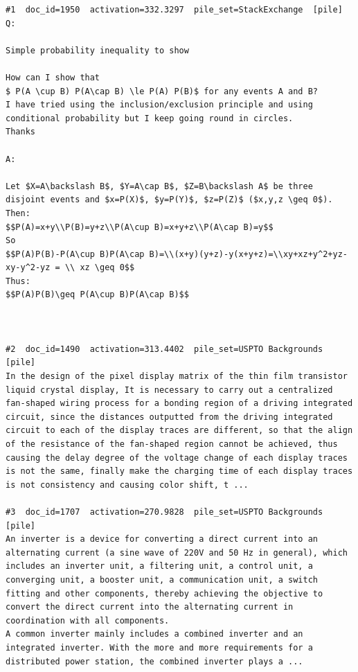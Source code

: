 \begin{verbatim}
#1  doc_id=1950  activation=332.3297  pile_set=StackExchange  [pile]
Q:

Simple probability inequality to show

How can I show that 
$ P(A \cup B) P(A\cap B) \le P(A) P(B)$ for any events A and B?
I have tried using the inclusion/exclusion principle and using conditional probability but I keep going round in circles.
Thanks

A:

Let $X=A\backslash B$, $Y=A\cap B$, $Z=B\backslash A$ be three disjoint events and $x=P(X)$, $y=P(Y)$, $z=P(Z)$ ($x,y,z \geq 0$). 
Then:
$$P(A)=x+y\\P(B)=y+z\\P(A\cup B)=x+y+z\\P(A\cap B)=y$$
So
$$P(A)P(B)-P(A\cup B)P(A\cap B)=\\(x+y)(y+z)-y(x+y+z)=\\xy+xz+y^2+yz-xy-y^2-yz = \\ xz \geq 0$$
Thus:
$$P(A)P(B)\geq P(A\cup B)P(A\cap B)$$



#2  doc_id=1490  activation=313.4402  pile_set=USPTO Backgrounds  [pile]
In the design of the pixel display matrix of the thin film transistor liquid crystal display, It is necessary to carry out a centralized fan-shaped wiring process for a bonding region of a driving integrated circuit, since the distances outputted from the driving integrated circuit to each of the display traces are different, so that the align of the resistance of the fan-shaped region cannot be achieved, thus causing the delay degree of the voltage change of each display traces is not the same, finally make the charging time of each display traces is not consistency and causing color shift, t ...

#3  doc_id=1707  activation=270.9828  pile_set=USPTO Backgrounds  [pile]
An inverter is a device for converting a direct current into an alternating current (a sine wave of 220V and 50 Hz in general), which includes an inverter unit, a filtering unit, a control unit, a converging unit, a booster unit, a communication unit, a switch fitting and other components, thereby achieving the objective to convert the direct current into the alternating current in coordination with all components.
A common inverter mainly includes a combined inverter and an integrated inverter. With the more and more requirements for a distributed power station, the combined inverter plays a ...


\end{verbatim}
